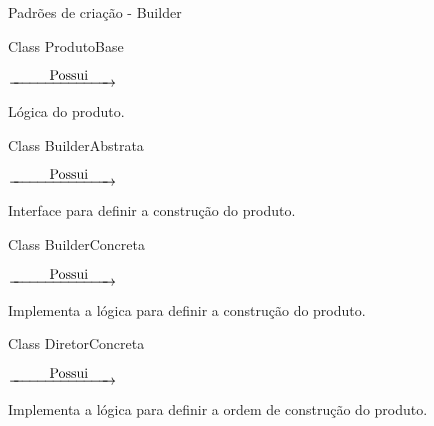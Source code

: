 \begin{frame}[t]{Padrões de criação - Builder}
	

	\centering
	\begin{minipage}{4cm}
		\begin{block}{}
			Class ProdutoBase
		\end{block}
	\end{minipage} 
	$\underrightarrow{\makebox[2cm][r]{Possui}\hspace{2em}}$
	\begin{minipage}{6cm}
		\begin{block}{}
			Lógica do produto.
		\end{block}
	\end{minipage}
	\vfill
	\begin{minipage}{4cm}
		\begin{block}{}
			Class BuilderAbstrata
		\end{block}
	\end{minipage} 
	$\underrightarrow{\makebox[2cm][r]{Possui}\hspace{2em}}$
	\begin{minipage}{6cm}
		\begin{block}{}
			Interface para definir a construção do produto.
		\end{block}
	\end{minipage}
	\vfill
	\begin{minipage}{4cm}
		\begin{block}{}
			Class BuilderConcreta
		\end{block}
	\end{minipage} 
	$\underrightarrow{\makebox[2cm][r]{Possui}\hspace{2em}}$
	\begin{minipage}{6cm}
		\begin{block}{}
			Implementa a lógica para definir a construção do produto.
		\end{block}
	\end{minipage}
	\vfill
	\begin{minipage}{4cm}
		\begin{block}{}
			Class DiretorConcreta
		\end{block}
	\end{minipage} 
	$\underrightarrow{\makebox[2cm][r]{Possui}\hspace{2em}}$
	\begin{minipage}{6cm}
		\begin{block}{}
			Implementa a lógica para definir a ordem de construção do produto.

\end{block}
\end{minipage}
\end{frame}
